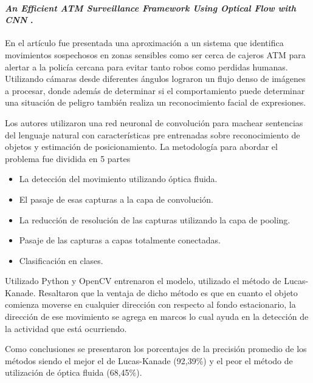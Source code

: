 \paragraph{
    \textbf{\emph{An Efficient ATM Surveillance
    Framework Using Optical Flow
    with CNN}
    }
    \cite[pág. 39]{chaudhary_microservices_2020}.
}

En el artículo fue presentada una aproximación a un sistema que identifica movimientos sospechosos en zonas sensibles como ser cerca de cajeros ATM para alertar a la policía cercana para evitar tanto robos como perdidas humanas. 
Utilizando cámaras desde diferentes ángulos lograron un flujo denso de imágenes a procesar, donde además de determinar si el comportamiento puede determinar una situación de peligro también realiza un reconocimiento facial de expresiones. 

Los autores utilizaron una red neuronal de convolución para machear sentencias del lenguaje natural con  
características pre entrenadas sobre reconocimiento de objetos y estimación de posicionamiento.
La metodología para abordar el problema fue dividida en 5 partes 

\begin{itemize}
    \item La detección del movimiento utilizando óptica fluida. 
    \item El pasaje de esas capturas a la capa de convolución. 
    \item La reducción de resolución de las capturas utilizando la capa de pooling. 
    \item Pasaje de las capturas a capas totalmente conectadas.
    \item Clasificación en clases. 
\end{itemize}

Utilizado Python y OpenCV entrenaron el modelo, utilizado el método de Lucas-Kanade. 
Resaltaron que la ventaja de dicho método es que en cuanto el objeto comienza
moverse en cualquier dirección con respecto al fondo estacionario, la dirección de
ese movimiento se agrega en marcos lo cual ayuda en la detección de la actividad que está ocurriendo.

Como conclusiones se presentaron los porcentajes de la precisión promedio de los métodos siendo el mejor el de Lucas-Kanade (92,39\%) y el peor el método de utilización de óptica fluida (68,45\%).

